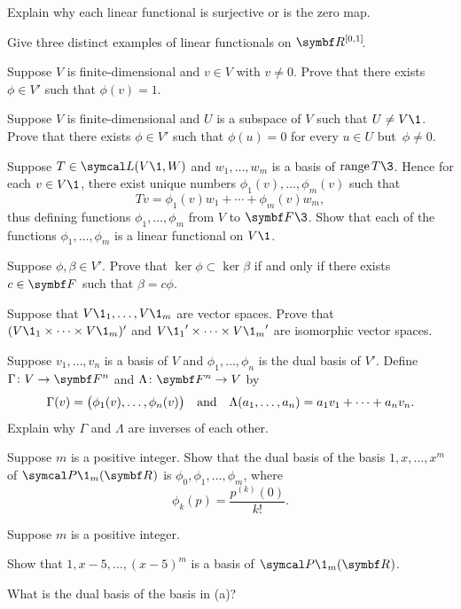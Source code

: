 \begin{exercises}

\exercise
Explain why each linear functional is surjective or is the zero map.


\exercise
Give three distinct examples of linear functionals on $\RR{[0,1]}$.


\exercise
Suppose $V$ is finite-dimensional and $v \in V$ with $v \ne 0$. Prove that there exists $\phi \in V'$ such that $\phi(v) = 1$. \label{HB1}


\exercise  \label{4321}
Suppose $V$ is finite-dimensional and $U$ is a subspace of $V$ such that $U \ne V\1$. Prove that there exists $\phi \in V'$ such that $\phi(u) = 0$ for every $u \in U$ but~$\phi \ne 0$.


\exercise
Suppose $T \in \L(V\1, W)$ and $w_1, \ldots, w_m$ is a basis of $\ran T\3$. Hence for each $v \in V\1$, there exist unique numbers
$\phi_1(v), \ldots, \phi_m(v)$ such that
\[
Tv = \phi_1(v) w_1 + \cdots + \phi_m(v) w_m,
\]
thus defining functions $\phi_1, \ldots, \phi_m$ from $V$ to $\F{}\3$.
Show that each of the functions $\phi_1, \ldots, \phi_m$ is a linear functional on $V\1$.


\exercise
Suppose $\phi, \beta \in V'\!$. Prove that $\ker \phi \subset \ker \beta$ if and only if there exists $c \in \F{}$ such that $\beta = c \phi$.\label{7nullsub}


\exercise
Suppose that $V\1_1, \ldots, V\1_m$ are vector spaces. Prove that $(V\1_1 \times \dots \times V\1_m)'$ and ${V\1_1}' \times \dots \times {V\1_m}'$ are isomorphic vector spaces.


\exercise
Suppose $v_1, \ldots, v_n$ is a basis of $V$ and $\phi_1, \ldots, \phi_n$ is the dual basis of $V'\!$. Define $\fun \Gamma  V {\F n}$ and
$\fun \Lambda {\F n} V$ by
\[
\Gamma(v) = \paren[\big]{ \phi_1(v), \ldots, \phi_n(v) }
\andd
\Lambda(a_1, \ldots, a_n) = a_1 v_1 + \cdots + a_n v_n.
\]
Explain why $\Gamma$ and $\Lambda$ are inverses of each other.


\exercise
Suppose $m$ is a positive integer. Show that the dual basis of the basis $1, x, \dots, x^m$ of $\P\1_m(\R{})$ is $\phi_0, \phi_1, \dots, \phi_m$, where
\[
\phi_k(p) = \frac{p^{(k)}(0)}{k!}.
\]


\exercise
Suppose $m$ is a positive integer.
\begin{subtheorem}
\item
Show that $1, x-5, \dots, (x-5)^m$ is a basis of $\P\1_m(\R{})$.
\item
What is the dual basis of the basis in (a)?
\end{subtheorem}
\exercisesubtheoremend



\end{exercises}
